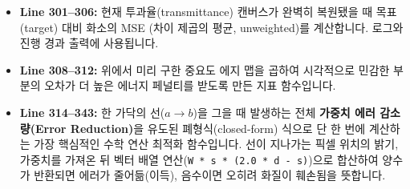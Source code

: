 \begin{itemize}
\item \textbf{Line 301--306:} 현재 투과율(transmittance) 캔버스가 완벽히 복원됐을 때 목표(target) 대비 화소의 MSE (차이 제곱의 평균, unweighted)를 계산합니다. 로그와 진행 경과 출력에 사용됩니다.
\item \textbf{Line 308--312:} 위에서 미리 구한 중요도 에지 맵을 곱하여 시각적으로 민감한 부분의 오차가 더 높은 에너지 페널티를 받도록 만든 지표 함수입니다.
\item \textbf{Line 314--343:} 한 가닥의 선(\(a \rightarrow b\))을 그을 때 발생하는 전체 \textbf{가중치 에러 감소량(Error Reduction)}을 유도된 폐형식(closed-form) 식으로 단 한 번에 계산하는 가장 핵심적인 수학 연산 최적화 함수입니다. 선이 지나가는 픽셀 위치의 밝기, 가중치를 가져온 뒤 벡터 배열 연산(\texttt{W * s * (2.0 * d - s)})으로 합산하여 양수가 반환되면 에러가 줄어듦(이득), 음수이면 오히려 화질이 훼손됨을 뜻합니다.
\end{itemize}

